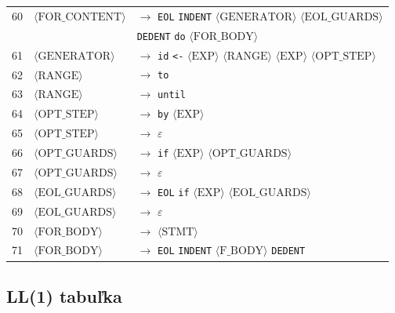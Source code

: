 \begin{longtable}{l l l}
60 & $\langle\text{FOR\_CONTENT}\rangle$ & $\rightarrow$ \texttt{EOL} \texttt{INDENT} $\langle\text{GENERATOR}\rangle$ $\langle\text{EOL\_GUARDS}\rangle$ \\
 & & \hspace{1.2em}\texttt{DEDENT} \texttt{do} $\langle\text{FOR\_BODY}\rangle$ \\
61 & $\langle\text{GENERATOR}\rangle$ & $\rightarrow$ \texttt{id} \texttt{<-} $\langle\text{EXP}\rangle$ $\langle\text{RANGE}\rangle$ $\langle\text{EXP}\rangle$ $\langle\text{OPT\_STEP}\rangle$ \\
62 & $\langle\text{RANGE}\rangle$ & $\rightarrow$ \texttt{to} \\
63 & $\langle\text{RANGE}\rangle$ & $\rightarrow$ \texttt{until} \\
64 & $\langle\text{OPT\_STEP}\rangle$ & $\rightarrow$ \texttt{by} $\langle\text{EXP}\rangle$ \\
65 & $\langle\text{OPT\_STEP}\rangle$ & $\rightarrow$ $\varepsilon$ \\
66 & $\langle\text{OPT\_GUARDS}\rangle$ & $\rightarrow$ \texttt{if} $\langle\text{EXP}\rangle$ $\langle\text{OPT\_GUARDS}\rangle$ \\
67 & $\langle\text{OPT\_GUARDS}\rangle$ & $\rightarrow$ $\varepsilon$ \\
68 & $\langle\text{EOL\_GUARDS}\rangle$ & $\rightarrow$ \texttt{EOL} \texttt{if} $\langle\text{EXP}\rangle$ $\langle\text{EOL\_GUARDS}\rangle$ \\
69 & $\langle\text{EOL\_GUARDS}\rangle$ & $\rightarrow$ $\varepsilon$ \\
70 & $\langle\text{FOR\_BODY}\rangle$ & $\rightarrow$ $\langle\text{STMT}\rangle$ \\
71 & $\langle\text{FOR\_BODY}\rangle$ & $\rightarrow$ \texttt{EOL} \texttt{INDENT} $\langle\text{F\_BODY}\rangle$ \texttt{DEDENT} \\
\end{longtable}
\normalsize









\subsection{LL(1) tabuľka}


